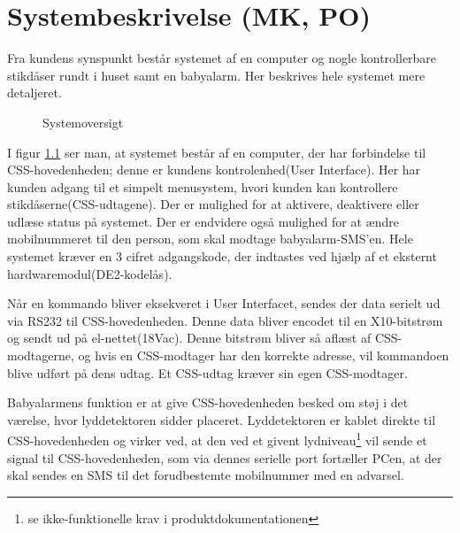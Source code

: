\chapter{Systembeskrivelse (MK, PO)}

Fra kundens synspunkt består systemet af en computer og nogle kontrollerbare stikdåser rundt i huset samt en babyalarm. Her beskrives hele systemet mere detaljeret.

\begin{figure}[H] \centering
{}
\caption{Systemoversigt}
\label{fig:sys_oversigt}
\end{figure}

I figur \ref{fig:sys_oversigt} ser man, at systemet består af en computer, der har forbindelse til CSS-hovedenheden; denne er kundens kontrolenhed(User Interface). Her har kunden adgang til et simpelt menusystem, hvori kunden kan kontrollere stikdåserne(CSS-udtagene). Der er mulighed for at aktivere, deaktivere eller udlæse status på systemet. Der er endvidere også mulighed for at ændre mobilnummeret til den person, som skal modtage babyalarm-SMS'en. Hele systemet kræver en 3 cifret adgangskode, der indtastes ved hjælp af et eksternt hardwaremodul(DE2-kodelås).

Når en kommando bliver eksekveret i User Interfacet, sendes der data serielt ud via RS232 til CSS-hovedenheden. Denne data bliver encodet til en X10-bitstrøm og sendt ud på el-nettet(18Vac). Denne bitstrøm bliver så aflæst af CSS-modtagerne, og hvis en CSS-modtager har den korrekte adresse, vil kommandoen blive udført på dens udtag. Et CSS-udtag kræver sin egen CSS-modtager.

Babyalarmens funktion er at give CSS-hovedenheden besked om støj i det værelse, hvor lyddetektoren sidder placeret. Lyddetektoren er kablet direkte til CSS-hovedenheden og virker ved, at den ved et givent lydniveau\footnote{se ikke-funktionelle krav i produktdokumentationen} vil sende et signal til CSS-hovedenheden, som via dennes serielle port fortæller PCen, at der skal sendes en SMS til det forudbestemte mobilnummer med en advarsel.

